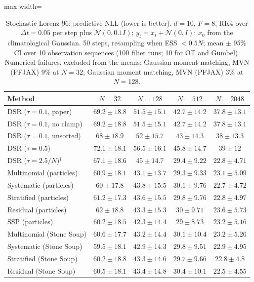 \begin{table}[H]
\centering
\small
\caption{Stochastic Lorenz-96: predictive NLL (lower is better). $d{=}10$, $F{=}8$, RK4 over $\Delta t{=}0.05$ per step plus $\mathcal N(0,0.1I)$; $y_t=x_t+\mathcal N(0,I)$; $x_0$ from the climatological Gaussian. 50 steps, resampling when ESS $<0.5N$; mean $\pm$ 95\% CI over 10 observation sequences (100 filter runs; 10 for OT and Gumbel). Numerical failures, excluded from the means: Gaussian moment matching, MVN (PFJAX) 9\% at $N{=}32$; Gaussian moment matching, MVN (PFJAX) 3\% at $N{=}128$.}
\label{tab:lorenz96-predictive_nll}
\begin{adjustbox}{max width=\linewidth}
\begin{tabular}{lcccc}
\toprule
Method & $N{=}32$ & $N{=}128$ & $N{=}512$ & $N{=}2048$ \\
\midrule
DSR ($\tau{=}0.1$, paper) & $69.2\pm18.8$ & $51.5\pm15.1$ & $42.7\pm14.2$ & $37.8\pm13.1$ \\
DSR ($\tau{=}0.1$, no clamp) & $69.2\pm18.8$ & $51.5\pm15.1$ & $42.7\pm14.2$ & $37.8\pm13.1$ \\
DSR ($\tau{=}0.1$, unsorted) & $68\pm18.9$ & $52\pm15.7$ & $43\pm14.3$ & $38\pm13.3$ \\
DSR ($\tau{=}0.5$) & $72.1\pm18.1$ & $56.5\pm16.1$ & $45.8\pm14.7$ & $39\pm12$ \\
DSR ($\tau{=}2.5/N$)$^\dagger$ & $67.1\pm18.6$ & $45\pm14.7$ & $29.4\pm9.22$ & $22.8\pm4.71$ \\
\midrule
Multinomial (particles) & $60.9\pm18.1$ & $43.1\pm13.7$ & $29.3\pm9.33$ & $23.1\pm5.09$ \\
Systematic (particles) & $60\pm17.8$ & $43.8\pm15.5$ & $30.1\pm9.76$ & $22.7\pm4.72$ \\
Stratified (particles) & $61.2\pm17.3$ & $43.6\pm15.5$ & $29.8\pm9.76$ & $22.8\pm4.97$ \\
Residual (particles) & $62\pm18.8$ & $43.3\pm15.3$ & $30\pm9.71$ & $23.6\pm5.73$ \\
SSP (particles) & $60.2\pm18.5$ & $42.3\pm14.4$ & $29\pm8.73$ & $23.2\pm5.16$ \\
Multinomial (Stone Soup) & $60.6\pm17.7$ & $43.2\pm14.4$ & $30.1\pm10.4$ & $23.2\pm5.26$ \\
Systematic (Stone Soup) & $59.5\pm18.1$ & $42.9\pm14.3$ & $29.8\pm9.51$ & $22.9\pm4.95$ \\
Stratified (Stone Soup) & $60.2\pm18.8$ & $43.3\pm14.6$ & $29.7\pm9.66$ & $22.8\pm4.8$ \\
Residual (Stone Soup) & $60.5\pm18.1$ & $43.4\pm14.8$ & $30.4\pm10.1$ & $22.5\pm4.55$ \\

\end{tabular}
\end{adjustbox}
\end{table}
